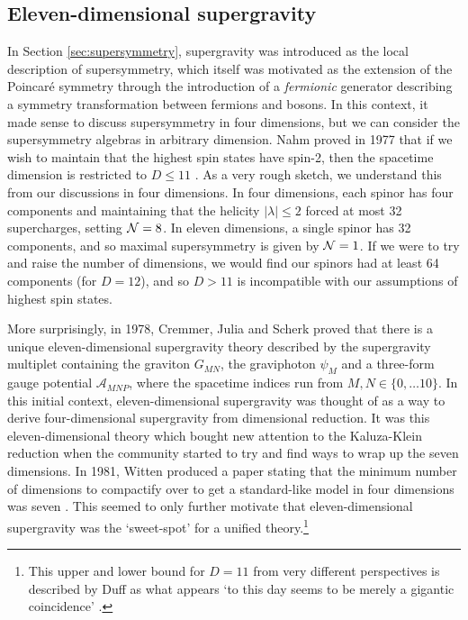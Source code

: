 \subsection{Eleven-dimensional supergravity}

In Section \ref{sec:supersymmetry}, supergravity was introduced as the local description of supersymmetry, which itself was motivated as the extension of the Poincar\'e symmetry through the introduction of a \emph{fermionic} generator describing a symmetry transformation between fermions and bosons. In this context, it made sense to discuss supersymmetry in four dimensions, but we can consider the supersymmetry algebras in arbitrary dimension. Nahm proved in 1977 that if we wish to maintain that the highest spin states have spin-2, then the spacetime dimension is restricted to $D \leq 11$ \cite{Nahm:1977tg}. As a very rough sketch, we understand this from our discussions in four dimensions. In four dimensions, each spinor has four components and maintaining that the helicity $|\lambda| \leq 2$ forced at most 32 supercharges, setting ${\cal N} = 8$. In eleven dimensions, a single spinor has 32 components, and so maximal supersymmetry is given by ${\cal N} = 1$. If we were to try and raise the number of dimensions, we would find our spinors had at least 64 components (for $D = 12$), and so $D > 11$ is incompatible with our assumptions of highest spin states. 

More surprisingly, in 1978, Cremmer, Julia and Scherk proved that there is a unique eleven-dimensional supergravity theory described by the supergravity multiplet containing the graviton $G_{MN}$, the graviphoton $\psi_M$ and a three-form gauge potential $\mathcal{A}_{MNP}$, where the spacetime indices run from $M,N \in \{0,\ldots 10\}$. In this initial context, eleven-dimensional supergravity was thought of as a way to derive four-dimensional supergravity from dimensional reduction. It was this eleven-dimensional theory which bought new attention to the Kaluza-Klein reduction when the community started to try and find ways to wrap up the seven dimensions. In 1981, Witten produced a paper stating that the minimum number of dimensions to compactify over to get a standard-like model in four dimensions was seven \cite{Witten:1981me}. This seemed to only further motivate that eleven-dimensional supergravity was the `sweet-spot' for a unified theory.\footnote{This upper and lower bound for $D = 11$ from very different perspectives is described by Duff as what appears `to this day seems to be merely a gigantic coincidence' \cite{Duff:1999rk}.}

